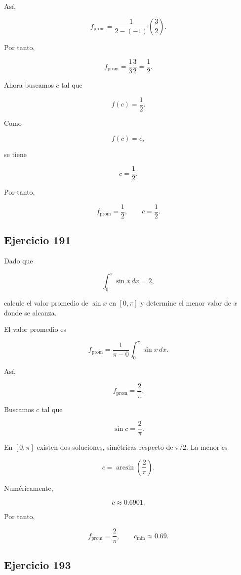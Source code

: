 \documentclass[12pt]{article}
\begin{document}
Así,

\[
f_{\mathrm{prom}}
=
\frac{1}{2-(-1)}
\left(\frac32\right).
\]

Por tanto,

\[
f_{\mathrm{prom}}
=
\frac13\frac32
=
\frac12.
\]

Ahora buscamos \(c\) tal que

\[
f(c)=\frac12.
\]

Como

\[
f(c)=c,
\]

se tiene

\[
c=\frac12.
\]

Por tanto,

\[
\boxed{
f_{\mathrm{prom}}=\frac12,
\qquad
c=\frac12
}.
\]

\subsection*{Ejercicio 191}

Dado que

\[
\int_0^\pi\sin x\,dx=2,
\]

calcule el valor promedio de \(\sin x\) en \([0,\pi]\) y determine el
menor valor de \(x\) donde se alcanza.

El valor promedio es

\[
f_{\mathrm{prom}}
=
\frac{1}{\pi-0}
\int_0^\pi\sin x\,dx.
\]

Así,

\[
f_{\mathrm{prom}}
=
\frac{2}{\pi}.
\]

Buscamos \(c\) tal que

\[
\sin c=\frac{2}{\pi}.
\]

En \([0,\pi]\) existen dos soluciones, simétricas respecto de
\(\pi/2\). La menor es

\[
c
=
\arcsin\left(\frac2\pi\right).
\]

Numéricamente,

\[
c\approx0.6901.
\]

Por tanto,

\[
\boxed{
f_{\mathrm{prom}}=\frac2\pi,
\qquad
c_{\min}\approx0.69
}.
\]

\subsection*{Ejercicio 193}
\end{document}
